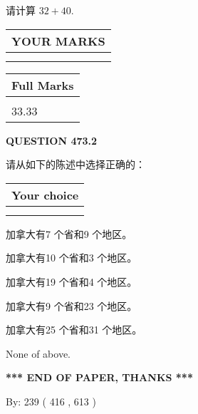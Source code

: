 \documentclass{ctexart}
\begin{document}
  
 
请计算 $ %
32 +  %
40 $.
 

 

 
  
\vspace{0.2in}
  
\noindent\begin{tabular}{|l|}
\hline
 YOUR MARKS  \\
\hline
 \\ 
 \\ 
\hline
\end{tabular}
\hspace{0.05in} \begin{tabular}{|l|}
\hline
 Full Marks  \\
\hline
 \\ 
33.33 \\
\hline
\end{tabular}
{\textbf{\Large{QUESTION
473.2 
}}}
  
  
请从如下的陈述中选择正确的：
  
  
\noindent\hspace{3.0in} \begin{tabular}{|l|}
\hline
Your choice \\
\hline
 \\ 
 \\ 
\hline
\end{tabular}
  
  
 
 
加拿大有7 个省和9 个地区。
 
 
加拿大有10 个省和3 个地区。
 
 
加拿大有19 个省和4 个地区。
 
 
加拿大有9 个省和23 个地区。
 
 
加拿大有25 个省和31 个地区。
 
 
 None of above.
 
 
   
   
 \vspace{0.2in}
 
   
   
   
   
\vspace{1.0in} 
{\textbf{\large{ *** END OF PAPER, THANKS *** }}} 
   
   
\hspace{1.0in} By: 
 239 ( 416 ,  613 )
   
\end{document}
